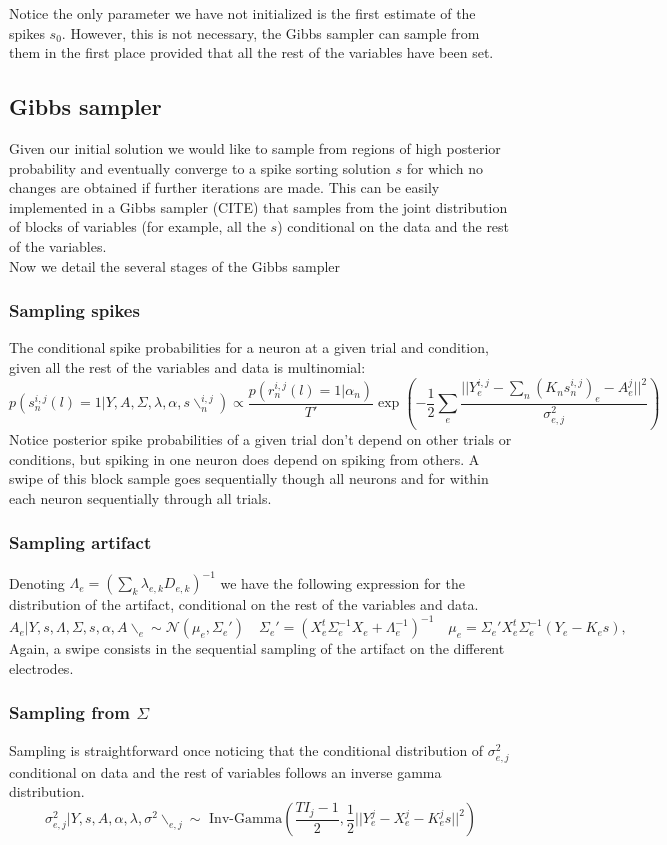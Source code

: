 \documentclass[12pt,letterpaper,fleqn]{article}
\begin{document}
Notice the only parameter we have not initialized is the first estimate of the spikes $s_0$. However, this is not necessary, the Gibbs sampler can sample from them in the first place provided that all the rest of the variables have been set.  
\subsection{Gibbs sampler}
Given our initial solution we would like to sample from regions of high posterior probability and eventually converge to a spike sorting solution $s$ for which no changes are obtained if further iterations are made. This can be easily implemented in a Gibbs sampler (CITE) that samples from the joint distribution of blocks of variables (for example, all the $s$) conditional on the data and the rest of the variables. \\Now we detail the several stages of the Gibbs sampler
\subsubsection{Sampling spikes}
The conditional spike probabilities for a neuron at a given trial and condition, given all the rest of the variables and data is multinomial:
$$p(s_n^{i,j}(l)=1|Y,A,\Sigma,\lambda,\alpha,s\backslash_{n}^{i,j})\propto \frac{p(r_n^{i,j}(l)=1|\alpha_n)}{T'}\exp\left(-\frac{1}{2}\sum_e \frac{||Y_e^{i,j}-\sum_n (K_n  s_n^{i,j})_e-A^j_e||^2}{\sigma^2_{e,j}}\right)$$
Notice posterior spike probabilities of a given trial don't depend on other trials or conditions, but spiking in one neuron does depend on spiking from others. A swipe of this block sample goes sequentially though all neurons and for within each neuron sequentially through all trials. 
\subsubsection{Sampling artifact}
Denoting $\Lambda_e=\left(\sum_k \lambda_{e,k} D_{e,k}\right)^{-1}$ we have the following expression for the distribution of the artifact, conditional on the rest of the variables and data.
$$A_e|Y,s,\Lambda,\Sigma,s,\alpha,A\backslash_{e}\sim \mathcal{N}(\mu_e,\Sigma_e')\quad \Sigma_e'=\left(X_e^t\Sigma_e^{-1}X_e+\Lambda_e^{-1}\right)^{-1}\quad \mu_e=\Sigma_e'X_e^t\Sigma_e^{-1}(Y_e-K_es),$$
Again, a swipe consists in the sequential sampling of the artifact on the different electrodes.
\subsubsection{Sampling from $\Sigma$}
Sampling is straightforward once noticing that the conditional distribution of $\sigma^2_{e,j}$ conditional on data and the rest of variables follows an inverse gamma distribution.
$$\sigma^2_{e,j}|Y,s,A,\alpha,\lambda,\sigma^2\backslash_{e,j}\sim\text{ Inv-Gamma}\left(\frac{T I_j-1}{2},\frac{1}{2}||Y_e^j-X_e^j-K_e^js||^2\right)$$
\end{document}
